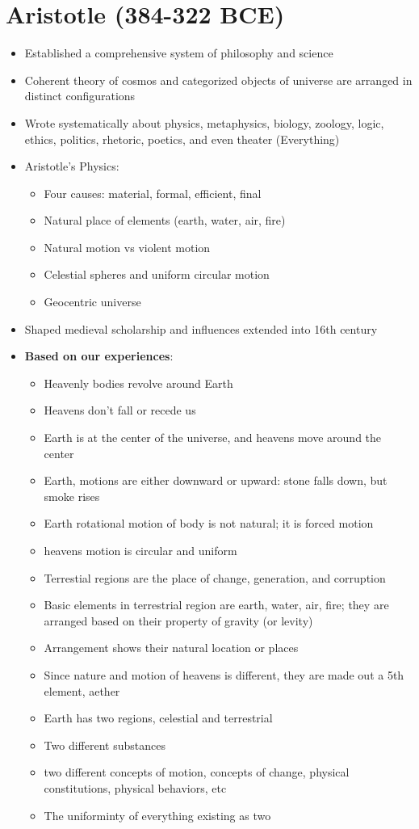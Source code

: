 \documentclass{article}
\begin{document}
\section*{Aristotle (384-322 BCE)}
\begin{itemize}
  \item Established a comprehensive system of philosophy and science
  \item Coherent theory of cosmos and categorized objects of universe are arranged in
    distinct configurations
  \item Wrote systematically about physics, metaphysics, biology, zoology, logic,
    ethics, politics, rhetoric, poetics, and even theater (Everything)
  \item Aristotle's Physics:
    \begin{itemize}
      \item Four causes: material, formal, efficient, final
      \item Natural place of elements (earth, water, air, fire)
      \item Natural motion vs violent motion
      \item Celestial spheres and uniform circular motion
      \item Geocentric universe
    \end{itemize}
  \item Shaped medieval scholarship and influences extended into 16th century
\item \textbf{Based on our experiences}:
  \begin{itemize}
    \item Heavenly bodies revolve around Earth
    \item Heavens don't fall or recede us
    \item Earth is at the center of the universe,
      and heavens move around the center
    \item Earth, motions are either downward or upward:
      stone falls down, but smoke rises
    \item Earth rotational motion of body is not natural;
      it is forced motion
    \item heavens motion is circular and uniform
    \item Terrestial regions are the place of change,
      generation, and corruption
    \item Basic elements in terrestrial region are earth, water, air, fire;
      they are arranged based on their property of gravity (or levity)
    \item Arrangement shows their natural location or places
    \item Since nature and motion of heavens is different,
      they are made out a 5th element, aether
    \item Earth has two regions, celestial and terrestrial
    \item Two different substances
    \item two different concepts of motion, concepts of change,
      physical constitutions, physical behaviors, etc
    \item The uniforminty of everything existing as two
  \end{itemize}
\end{itemize}
\end{document}
